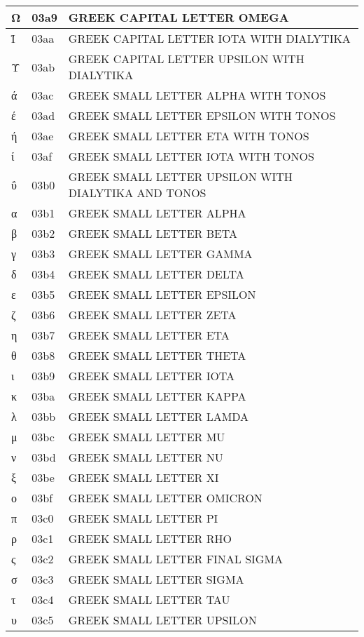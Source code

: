 \documentclass[12pt,letterpaper,openany]{book}
\begin{document}
\begin{center}
\begin{supertabular}{|m{0.25in}|m{0.5in}|m{4in}|}
			Ω & 03a9 & GREEK CAPITAL LETTER OMEGA\\\hline
			Ϊ & 03aa & GREEK CAPITAL LETTER IOTA WITH DIALYTIKA\\\hline
			Ϋ & 03ab & GREEK CAPITAL LETTER UPSILON WITH DIALYTIKA\\\hline
			ά & 03ac & GREEK SMALL LETTER ALPHA WITH TONOS\\\hline
			έ & 03ad & GREEK SMALL LETTER EPSILON WITH TONOS\\\hline
			ή & 03ae & GREEK SMALL LETTER ETA WITH TONOS\\\hline
			ί & 03af & GREEK SMALL LETTER IOTA WITH TONOS\\\hline
			ΰ & 03b0 & GREEK SMALL LETTER UPSILON WITH DIALYTIKA AND TONOS\\\hline
			α & 03b1 & GREEK SMALL LETTER ALPHA\\\hline
			β & 03b2 & GREEK SMALL LETTER BETA\\\hline
			γ & 03b3 & GREEK SMALL LETTER GAMMA\\\hline
			δ & 03b4 & GREEK SMALL LETTER DELTA\\\hline
			ε & 03b5 & GREEK SMALL LETTER EPSILON\\\hline
			ζ & 03b6 & GREEK SMALL LETTER ZETA\\\hline
			η & 03b7 & GREEK SMALL LETTER ETA\\\hline
			θ & 03b8 & GREEK SMALL LETTER THETA\\\hline
			ι & 03b9 & GREEK SMALL LETTER IOTA\\\hline
			κ & 03ba & GREEK SMALL LETTER KAPPA\\\hline
			λ & 03bb & GREEK SMALL LETTER LAMDA\\\hline
			μ & 03bc & GREEK SMALL LETTER MU\\\hline
			ν & 03bd & GREEK SMALL LETTER NU\\\hline
			ξ & 03be & GREEK SMALL LETTER XI\\\hline
			ο & 03bf & GREEK SMALL LETTER OMICRON\\\hline
			π & 03c0 & GREEK SMALL LETTER PI\\\hline
			ρ & 03c1 & GREEK SMALL LETTER RHO\\\hline
			ς & 03c2 & GREEK SMALL LETTER FINAL SIGMA\\\hline
			σ & 03c3 & GREEK SMALL LETTER SIGMA\\\hline
			τ & 03c4 & GREEK SMALL LETTER TAU\\\hline
			υ & 03c5 & GREEK SMALL LETTER UPSILON\\\hline

\end{supertabular}
\end{center}
\end{document}
